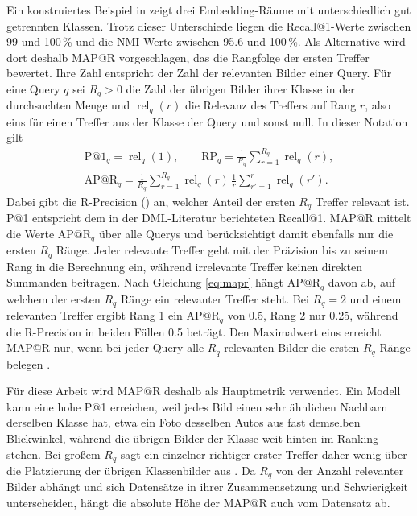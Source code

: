 Ein konstruiertes Beispiel in \textcite{musgrave_metric_2020} zeigt drei Embedding-Räume mit unterschiedlich gut getrennten Klassen. Trotz dieser Unterschiede liegen die Recall@1-Werte zwischen \num{99} und \num{100}\,\% und die \ac{NMI}-Werte zwischen \num{95.6} und \num{100}\,\%. Als Alternative wird dort deshalb \ac{MAP@R} vorgeschlagen, das die Rangfolge der ersten Treffer bewertet. Ihre Zahl entspricht der Zahl der relevanten Bilder einer Query. Für eine Query $q$ sei $R_q>0$ die Zahl der übrigen Bilder ihrer Klasse in der durchsuchten Menge und $\operatorname{rel}_q(r)$ die Relevanz des Treffers auf Rang $r$, also eins für einen Treffer aus der Klasse der Query und sonst null. In dieser Notation gilt \cite{musgrave_metric_2020}
\begin{equation}
  \begin{gathered}
  \mathrm{P@1}_q=\operatorname{rel}_q(1),\qquad
  \mathrm{RP}_q=\frac{1}{R_q}\sum_{r=1}^{R_q}\operatorname{rel}_q(r),\\
  \mathrm{AP@R}_q=\frac{1}{R_q}\sum_{r=1}^{R_q}\operatorname{rel}_q(r)\,\frac{1}{r}\sum_{r'=1}^{r}\operatorname{rel}_q(r').
  \end{gathered}
  \label{eq:mapr}
\end{equation}
Dabei gibt die R-Precision () an, welcher Anteil der ersten $R_q$ Treffer relevant ist. \ac{P@1} entspricht dem in der \ac{DML}-Literatur berichteten Recall@1. MAP@R mittelt die Werte $\mathrm{AP@R}_q$ über alle Querys und berücksichtigt damit ebenfalls nur die ersten $R_q$ Ränge. Jeder relevante Treffer geht mit der Präzision bis zu seinem Rang in die Berechnung ein, während irrelevante Treffer keinen direkten Summanden beitragen. Nach Gleichung \eqref{eq:mapr} hängt $\mathrm{AP@R}_q$ davon ab, auf welchem der ersten $R_q$ Ränge ein relevanter Treffer steht. Bei $R_q=2$ und einem relevanten Treffer ergibt Rang 1 ein $\mathrm{AP@R}_q$ von \num{0.5}, Rang 2 nur \num{0.25}, während die R-Precision in beiden Fällen \num{0.5} beträgt. Den Maximalwert eins erreicht \ac{MAP@R} nur, wenn bei jeder Query alle $R_q$ relevanten Bilder die ersten $R_q$ Ränge belegen \cite{musgrave_metric_2020}.

Für diese Arbeit wird MAP@R deshalb als Hauptmetrik verwendet. Ein Modell kann eine hohe P@1 erreichen, weil jedes Bild einen sehr ähnlichen Nachbarn derselben Klasse hat, etwa ein Foto desselben Autos aus fast demselben Blickwinkel, während die übrigen Bilder der Klasse weit hinten im Ranking stehen. Bei großem $R_q$ sagt ein einzelner richtiger erster Treffer daher wenig über die Platzierung der übrigen Klassenbilder aus \cite{musgrave_metric_2020}. Da $R_q$ von der Anzahl relevanter Bilder abhängt und sich Datensätze in ihrer Zusammensetzung und Schwierigkeit unterscheiden, hängt die absolute Höhe der \ac{MAP@R} auch vom Datensatz ab.

